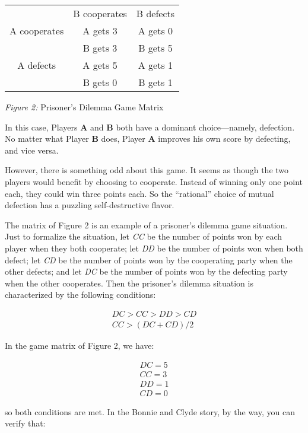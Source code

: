 \begin{center}
\begin{tabular}{c|c|c|}
             & B cooperates   & B defects  \\
\cline{2-3}
A cooperates & A gets 3       & A gets 0   \\
             & B gets 3       & B gets 5   \\
\cline{2-3}
A defects    & A gets 5       & A gets 1 \\
             & B gets 0       & B gets 1 \\
\cline{2-3}
\end{tabular}
\end{center}

\centerline{{\it Figure 2:\/} Prisoner's Dilemma Game Matrix}


In this case, Players {\bf A} and {\bf B} both have a dominant
choice---namely, defection. No matter what Player {\bf B} does,
Player {\bf A} improves his own score by defecting, and vice versa.

However, there is something odd about this game. It seems as though
the two players would benefit by choosing to cooperate. Instead of
winning only one point each, they could win three points each.  So the
``rational'' choice of mutual defection has a puzzling
self-destructive flavor.

The matrix of Figure 2 is an example of a prisoner's dilemma game
situation. Just to formalize the situation, let {\it CC} be the number
of points won by each player when they both cooperate; let {\it DD} be
the number of points won when both defect; let {\it CD} be the number
of points won by the cooperating party when the other defects; and let
{\it DC} be the number of points won by the defecting party when the
other cooperates. Then the prisoner's dilemma situation is
characterized by the following conditions:

\begin{eqnarray*}
DC > CC > DD > CD \\
CC > (DC + CD) / 2
\end{eqnarray*}

In the game matrix of Figure 2, we have:

\begin{eqnarray*}
DC = 5 \\
CC = 3 \\
DD = 1 \\
CD = 0
\end{eqnarray*}

\noindent so both conditions are met. In the Bonnie and Clyde story,
by the way, you can verify that:

